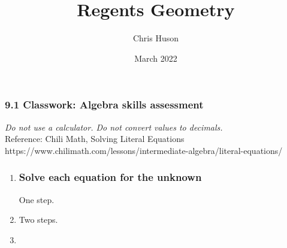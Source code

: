 \documentclass[12pt, twoside]{article}
\title{Regents Geometry}
\author{Chris Huson}
\date{March 2022}
\begin{document}
\subsubsection*{9.1 Classwork: Algebra skills assessment}
\emph{Do not use a calculator. Do not convert values to decimals.}\\
Reference: Chili Math, Solving Literal Equations \\
https://www.chilimath.com/lessons/intermediate-algebra/literal-equations/

\begin{enumerate}
\subsubsection*{Simplify each expression by ``collecting like terms''}
\item 
\begin{enumerate}[itemsep=2cm]
    \end{enumerate} \vspace{0.5cm}
  
\subsubsection*{Solve each equation for the unknown}  
One step.
\item 
\begin{enumerate}[itemsep=2cm]
    \end{enumerate} \vspace{1cm}
  
Two steps.
\item 
\begin{enumerate}[itemsep=2cm]
    \end{enumerate} 
  

\end{enumerate}
\end{document}
